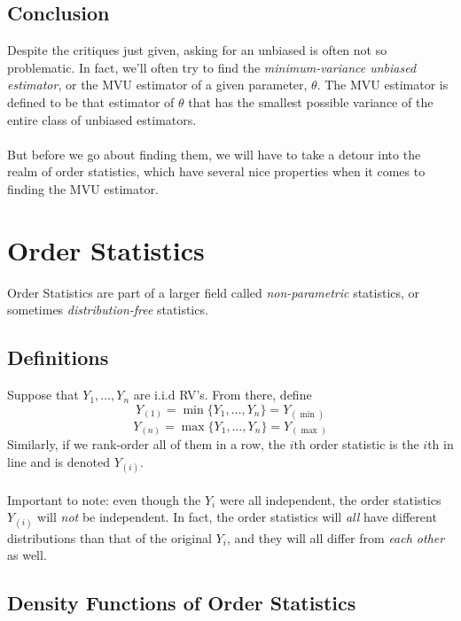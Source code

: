 \documentclass[a4paper,12pt]{scrartcl}
\begin{document}
\subsection{Conclusion}

Despite the critiques just given, asking for an unbiased is often
not so problematic.  In fact, we'll often try to find
the \emph{minimum-variance unbiased estimator}, or the MVU estimator
of a given parameter, $\theta$.  The MVU estimator is defined to be that
estimator of $\theta$ that has the smallest possible
variance of the entire class of unbiased estimators.
\\
\\
But before we go about finding them, we will have to take a detour
into the realm of order statistics, which have several nice properties
when it comes to finding the MVU estimator. 

\newpage

\section{Order Statistics}

Order Statistics are part of a larger field called 
\emph{non-parametric} statistics, or sometimes \emph{distribution-free}
statistics.


\subsection{Definitions}

Suppose that $Y_1, \ldots, Y_n$ are i.i.d RV's. From there, define
   \[ Y_{(1)} = \min\{Y_1, \ldots, Y_n\} = Y_{(\min)}  \]
   \[ Y_{(n)} = \max\{Y_1, \ldots, Y_n\} = Y_{(\max)}  \]
Similarly, if we rank-order all of them in a row, the $i$th order
statistic is the $i$th in line and is denoted $Y_{(i)}$.
\\
\\
Important to note: even though the $Y_i$ were all independent, the order
statistics $Y_{(i)}$ will \emph{not} be independent.  In fact, the
order statistics will \emph{all} have different distributions than
that of the original $Y_i$, and they will all differ from \emph{each
other} as well.

\subsection{Density Functions of Order Statistics}
\end{document}
